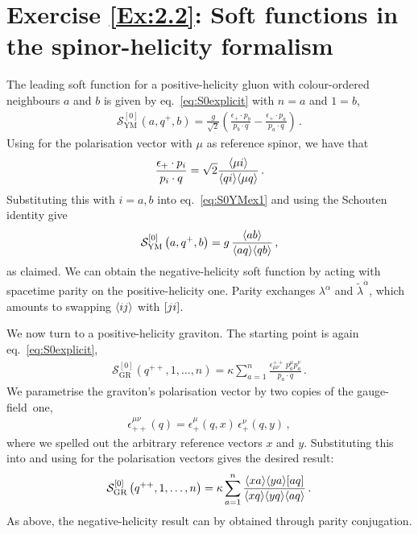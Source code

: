 \section*{Exercise \ref{Ex:2.2}: Soft functions in the spinor-helicity formalism}
\label{Sol:2.2}
%
The leading soft function for a positive-helicity gluon with colour-ordered neighbours $a$ and $b$ is given by eq.~\eqref{eq:S0explicit} with $n=a$ and $1=b$,
\begin{align} \label{eq:S0YMex1}
\mathcal{S}^{[0]}_{\text{YM}}\left(a,q^+,b\right) = \frac{g}{\sqrt{2}} \left(\frac{\epsilon_+ \cdot p_b}{p_b \cdot q} - \frac{\epsilon_+ \cdot p_a}{p_a \cdot q} \right)  \,.
\end{align}
Using  for the polarisation vector with $\mu$ as reference spinor, we have that
\begin{align}
\frac{\epsilon_+ \cdot p_i}{p_i \cdot q} = \sqrt{2} \frac{\langle \mu i \rangle}{\langle q i \rangle \langle \mu q \rangle} \,.
\end{align}
Substituting this with $i=a,b$ into eq.~\eqref{eq:S0YMex1} and using the Schouten identity give
\begin{align}
\mathcal{S}^{[0]}_{\text{YM}}\left(a,q^+,b\right) =  g \, \frac{\langle a b \rangle}{\langle a q \rangle \langle q b \rangle} \,,
\end{align}
as claimed. We can obtain the negative-helicity soft function by acting with spacetime parity on the positive-helicity one. Parity exchanges $\lambda^{\alpha}$ and $\tilde{\lambda}^{\dot\alpha}$, which amounts to swapping $\langle i j \rangle$ with $[ j i ]$.

We now turn to a positive-helicity graviton. The starting point is again eq.~\eqref{eq:S0explicit},
\begin{align} \label{eq:S0GMex1}
\mathcal{S}^{[0]}_{\text{GR}}\left(q^{++},1,\ldots,n\right) = \kappa \sum_{a=1}^n \frac{\epsilon^{++}_{\mu\nu} \, p_a^{\mu} p_a^{\nu}}{p_a \cdot q} \,.
\end{align}
We parametrise the graviton's polarisation vector by two copies of the gauge-field~one, 
\begin{align}
\epsilon_{++}^{\mu\nu}(q) = \epsilon_+^{\mu}(q,x) \, \epsilon_+^{\nu}(q,y) \,,
\end{align}
where we spelled out the arbitrary reference vectors $x$ and $y$. Substituting this into  and using  for the polarisation vectors gives the desired result:
\begin{align}
\mathcal{S}^{[0]}_{\text{GR}}\left(q^{++},1,\ldots,n\right) = \kappa \sum_{a=1}^n \frac{\langle x a \rangle \langle y a \rangle [ a q ]}{\langle x q \rangle \langle y q \rangle \langle a q \rangle} \,.
\end{align}
As above, the negative-helicity result can by obtained through parity conjugation.


